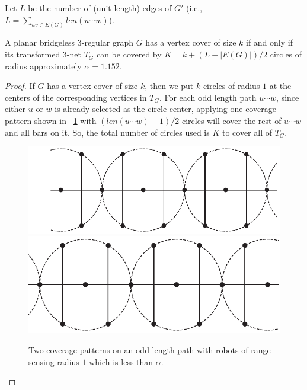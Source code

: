Let $L$ be the number of (unit length) edges of $G'$ (i.e., $L = 
\sum_{uv \in E(G)}len(u\cdots w)$). 
\begin{lemma}\label{l:bl}
A planar bridgeless $3$-regular graph $G$ has a vertex cover of size 
$k$ if and only if its transformed 3-net $T_G$ can be covered
by $K = k + (L-|E(G)|)/2$ circles of radius approximately $\alpha = 1.152$.
\end{lemma}
\begin{proof}
If $G$ has a vertex cover of size $k$, then we put $k$ circles of radius $1$
at the centers of the corresponding vertices in $T_G$. 
%
For each odd length path $u\cdots w$, since either $u$ or $w$ is already 
selected as the circle center, applying one coverage pattern shown
in ~\ref{fig:pathcover} with $(len(u\cdots w) - 1)/2$ circles will cover 
the rest of $u\cdots w$ and all bars on it. So, the total number of circles
used is $K$ to cover all of $T_G$. 

\begin{figure}[!ht]
  \vspace*{0mm}
      \centering
      \includegraphics[scale=0.3]{chapters/osg/figures/edgepath1-eps-converted-to.pdf}\vspace{3mm}
      \hfill
      \includegraphics[scale=0.3]{chapters/osg/figures/edgepath2-eps-converted-to.pdf}
  \vspace*{0mm}
     \caption{Two coverage patterns on an odd length path with robots of 
      range sensing radius $1$ which is less than $\alpha$.}
      \label{fig:pathcover}
  \end{figure}
  

\end{proof}
